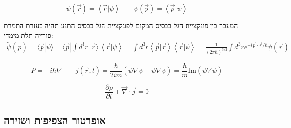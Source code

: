\documentclass{tstextbook}
\begin{document}
\begin{definition}
$$\psi\left(\vec{r}\right)=\left\langle \vec{r}|\psi \right\rangle  \qquad \psi\left( \vec{p} \right)=\left\langle  \vec{p}|\psi  \right\rangle $$

\end{definition}
\begin{proposition}
המעבר בין פונקציית הגל בבסיס המקום לפונקציית הגל בבסיס התנע תהיה בעזרת התמרת פורייה תלת מימדי:
$$\begin{gather}\widetilde{\psi}\left({\vec p}\right)=\langle {\vec p}|\psi \rangle=\langle {\vec p}|\int d^{3}r\,|{\vec r} \rangle\,\left\langle {\vec r}|\psi \right\rangle =\int d^{3}r\left\langle\vec{p}|\vec{r}\right\rangle\left\langle\vec{r}|\psi\right\rangle={\frac{1}{(2\pi\hbar)^{3/2}}}\int d^{3}r e^{-i\vec{p}\cdot\vec{r}/\hbar}\psi\left(\vec{r}\right)
\end{gather}$$

\end{proposition}
\begin{definition}
$$P=-i\hbar \bar{\nabla} \qquad j\left( \vec{r},t \right)={\frac{\hbar}{2i m}}\left(\overline{{{\psi}}}\nabla\psi-\psi\nabla\overline{{{\psi}}}\right)={\frac{\hbar}{m}}\mathrm{Im}\left(\overline{{{\psi}}}\nabla\psi\right)$$

\end{definition}
\begin{proposition}
$${\frac{\partial\rho}{\partial t}}+{\vec{\nabla}}\cdot\vec{j}=0$$

\end{proposition}
\subsection{אופרטור הצפיפות ושזירה}
\end{document}
